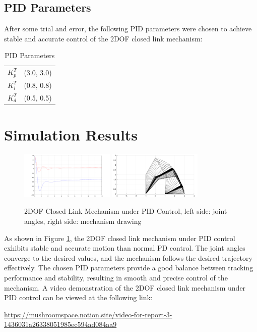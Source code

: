 \documentclass{article}
\begin{document}
\subsection*{PID Parameters}
After some trial and error, the following PID parameters were chosen to achieve stable and accurate control of the 2DOF closed link mechanism:
\begin{table}[h!]
  \centering
  \begin{tabular}{|c|c|}
    \hline
    \(K_p^T\) & (3.0, 3.0) \\
    \(K_i^T\) & (0.8, 0.8) \\
    \(K_d^T\) & (0.5, 0.5) \\
    \hline
  \end{tabular}
  \caption{PID Parameters}
  \label{tab:pid-params}
\end{table}
\section*{Simulation Results}

\begin{figure}[h!]
  \centering
  \includegraphics[width=0.4\textwidth]{assets/closed_mechanism_2DOF_PID_angles.png}
  \includegraphics[width=0.4\textwidth]{assets/closed_mechanism_2DOF_PID_draw.png}
  \caption{2DOF Closed Link Mechanism under PID Control, left side: joint angles, right side: mechanism drawing}
  \label{fig:2dof-closed-link-mechanism}
\end{figure}

As shown in Figure \ref{fig:2dof-closed-link-mechanism}, the 2DOF closed link mechanism under PID control exhibits stable and accurate motion than normal PD control. The joint angles converge to the desired values, and the mechanism follows the desired trajectory effectively. The chosen PID parameters provide a good balance between tracking performance and stability, resulting in smooth and precise control of the mechanism.
A video demonstration of the 2DOF closed link mechanism under PID control can be viewed at the following link:

\url{https://mushroomspace.notion.site/video-for-report-3-1436031a26338051985ec594ad084aa9}
\end{document}
